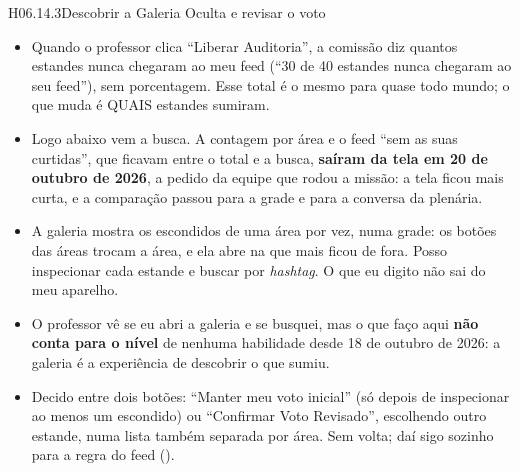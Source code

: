 \begin{historia}{H06.14.3}{Descobrir a Galeria Oculta e revisar o voto}{\parcial}
\aceite
\begin{itemize}
  \item Quando o professor clica \enquote{Liberar Auditoria}, a comissão diz
    quantos estandes nunca chegaram ao meu feed (\enquote{30 de 40 estandes
    nunca chegaram ao seu feed}), sem porcentagem. Esse total é o mesmo para
    quase todo mundo; o que muda é QUAIS estandes sumiram.
  \item Logo abaixo vem a busca. A contagem por área e o feed \enquote{sem as
    suas curtidas}, que ficavam entre o total e a busca, \textbf{saíram da
    tela em 20 de outubro de 2026}, a pedido da equipe que rodou a missão: a
    tela ficou mais curta, e a comparação passou para a grade e para a
    conversa da plenária.
  \item A galeria mostra os escondidos de uma área por vez, numa grade: os
    botões das áreas trocam a área, e ela abre na que mais ficou de fora.
    Posso inspecionar cada estande e buscar por \emph{hashtag}. O que eu
    digito não sai do meu aparelho.
  \item O professor vê se eu abri a galeria e se busquei, mas o que faço aqui
    \textbf{não conta para o nível} de nenhuma habilidade desde 18 de outubro
    de 2026: a galeria é a experiência de descobrir o que sumiu.
  \item Decido entre dois botões: \enquote{Manter meu voto inicial} (só
    depois de inspecionar ao menos um escondido) ou \enquote{Confirmar Voto
    Revisado}, escolhendo outro estande, numa lista também separada por
    área. Sem volta; daí sigo sozinho para a regra do feed ().
\end{itemize}
\end{historia}

